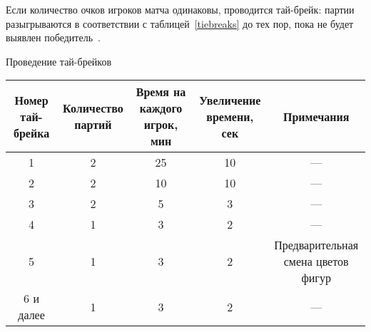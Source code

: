 Если количество очков игроков матча одинаковы, проводится тай-брейк: партии разыгрываются в соответствии с таблицей~\ref{tiebreaks} до тех пор, пока не будет выявлен победитель~\cite{fidewc}.

%
%
%

\begin{center}
	\begin{threeparttable}
		\captionsetup{justification=raggedright,singlelinecheck=off}
		\caption{\label{tiebreaks}Проведение тай-брейков}
		\centering
		\begin{tabular}{|c|c|c|c|c|}
			\hline
			\specialcell{Номер\\тай-брейка} & \specialcell{Количество\\партий} & \specialcell{Время на каждого\\игрок, мин} & \specialcell{Увеличение\\времени, сек} & Примечания \\
			\hline
			1 & 2 & 25 & 10 & ---\\
			\hline
			2 & 2 & 10 & 10 & ---\\
			\hline
			3 & 2 & 5 & 3 & ---\\
			\hline
			4 & 1 & 3 & 2 & ---\\
			\hline
			5 & 1 & 3 & 2 & \specialcell{Предварительная\\смена цветов фигур}\\
			\hline
			6 и далее & 1 & 3 & 2 & ---\\
			\hline
		\end{tabular}
	\end{threeparttable}
\end{center}

